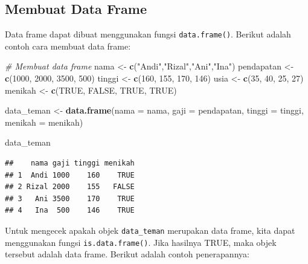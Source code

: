 \documentclass[]{book}
\newenvironment{Shaded}{\begin{snugshade}}{\end{snugshade}}
\newcommand{\KeywordTok}[1]{\textcolor[rgb]{0.13,0.29,0.53}{\textbf{#1}}}
\newcommand{\DataTypeTok}[1]{\textcolor[rgb]{0.13,0.29,0.53}{#1}}
\newcommand{\DecValTok}[1]{\textcolor[rgb]{0.00,0.00,0.81}{#1}}
\newcommand{\StringTok}[1]{\textcolor[rgb]{0.31,0.60,0.02}{#1}}
\newcommand{\CommentTok}[1]{\textcolor[rgb]{0.56,0.35,0.01}{\textit{#1}}}
\newcommand{\OtherTok}[1]{\textcolor[rgb]{0.56,0.35,0.01}{#1}}
\newcommand{\NormalTok}[1]{#1}
\begin{document}
\subsection{Membuat Data Frame}\label{membuat-data-frame}

Data frame dapat dibuat menggunakan fungsi \texttt{data.frame()}.
Berikut adalah contoh cara membuat data frame:

\begin{Shaded}
\begin{Highlighting}[]
\CommentTok{# Membuat data frame}
\NormalTok{nama <-}\StringTok{ }\KeywordTok{c}\NormalTok{(}\StringTok{"Andi"}\NormalTok{,}\StringTok{"Rizal"}\NormalTok{,}\StringTok{"Ani"}\NormalTok{,}\StringTok{"Ina"}\NormalTok{)}
\NormalTok{pendapatan <-}\StringTok{ }\KeywordTok{c}\NormalTok{(}\DecValTok{1000}\NormalTok{, }\DecValTok{2000}\NormalTok{, }\DecValTok{3500}\NormalTok{, }\DecValTok{500}\NormalTok{)}
\NormalTok{tinggi <-}\StringTok{ }\KeywordTok{c}\NormalTok{(}\DecValTok{160}\NormalTok{, }\DecValTok{155}\NormalTok{, }\DecValTok{170}\NormalTok{, }\DecValTok{146}\NormalTok{)}
\NormalTok{usia <-}\StringTok{ }\KeywordTok{c}\NormalTok{(}\DecValTok{35}\NormalTok{, }\DecValTok{40}\NormalTok{, }\DecValTok{25}\NormalTok{, }\DecValTok{27}\NormalTok{)}
\NormalTok{menikah <-}\StringTok{ }\KeywordTok{c}\NormalTok{(}\OtherTok{TRUE}\NormalTok{, }\OtherTok{FALSE}\NormalTok{, }\OtherTok{TRUE}\NormalTok{, }\OtherTok{TRUE}\NormalTok{)}

\NormalTok{data_teman <-}\StringTok{ }\KeywordTok{data.frame}\NormalTok{(}\DataTypeTok{nama =}\NormalTok{ nama,}
                         \DataTypeTok{gaji =}\NormalTok{ pendapatan,}
                         \DataTypeTok{tinggi =}\NormalTok{ tinggi,}
                         \DataTypeTok{menikah =}\NormalTok{ menikah)}

\NormalTok{data_teman}
\end{Highlighting}
\end{Shaded}

\begin{verbatim}
##    nama gaji tinggi menikah
## 1  Andi 1000    160    TRUE
## 2 Rizal 2000    155   FALSE
## 3   Ani 3500    170    TRUE
## 4   Ina  500    146    TRUE
\end{verbatim}

Untuk mengecek apakah objek \texttt{data\_teman} merupakan data frame,
kita dapat menggunakan fungsi \texttt{is.data.frame()}. Jika hasilnya
TRUE, maka objek tersebut adalah data frame. Berikut adalah contoh
penerapannya:
\end{document}
